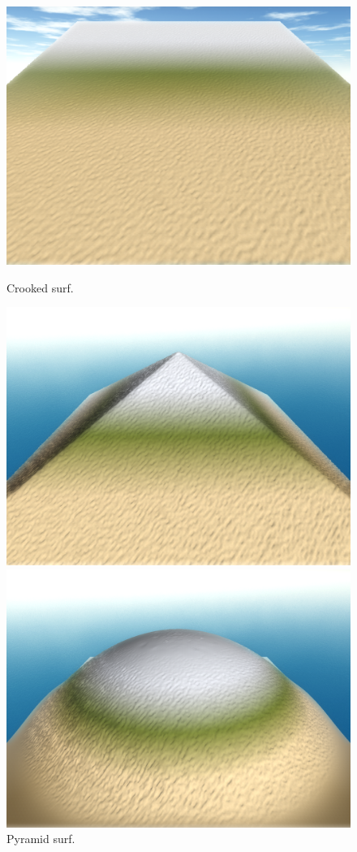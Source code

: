 \documentclass[11pt,a4paper,twoside,openright]{report}
\begin{document}
\begin{figure}[!htb]
  \includegraphics[width=\linewidth]{hydro-10mins-46k-iterations-crooked.png}
  \caption{Crooked surf.}\label{fig:hydro1}
\endminipage\hfill
{}
  \includegraphics[width=\linewidth]{hydro-10mins-46k-iterations-pyramid.png}
  \caption{Pyramid surf.}\label{fig:hydro2}
\endminipage\hfill
{}%
  \includegraphics[width=\linewidth]{hydro-10mins-46k-iterations-hemisphere.png}

\end{figure}
\end{document}
